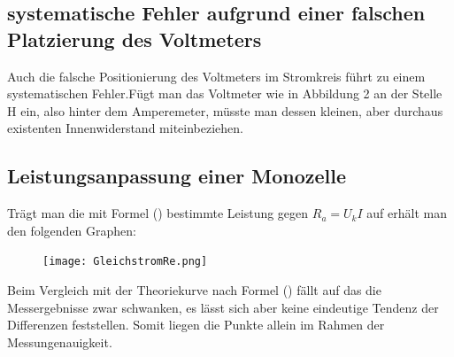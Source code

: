 \subsection{systematische Fehler aufgrund einer falschen Platzierung des Voltmeters}
Auch die falsche Positionierung des Voltmeters im Stromkreis führt zu einem
systematischen Fehler.Fügt man das Voltmeter wie in Abbildung 2 an der Stelle H
ein, also hinter dem Amperemeter, müsste man dessen kleinen, aber durchaus existenten
Innenwiderstand miteinbeziehen.

\newpage
\subsection{Leistungsanpassung einer Monozelle}
Trägt man die mit Formel () bestimmte Leistung gegen $R_a = U_k I$ auf erhält man
den folgenden Graphen:
\begin{figure}[H]
	\centering
	\caption{}
	\texttt{[image: GleichstromRe.png]}
	\label{fig:GleichstromLeistung}
\end{figure}
Beim Vergleich mit der Theoriekurve nach Formel () fällt auf das die Messergebnisse
zwar schwanken, es lässt sich aber keine eindeutige Tendenz der Differenzen feststellen.
Somit liegen die Punkte allein im Rahmen der Messungenauigkeit.
